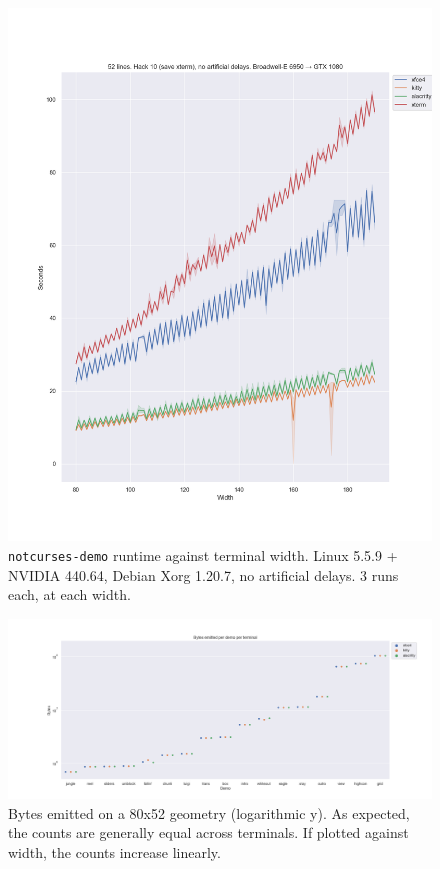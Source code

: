 \begin{figure}[!htb]
\centering
\includegraphics[width=1\textwidth]{media/nvidia-termsdemo.png}
\caption[NVIDIA GTX 1080 benchmarks, varying widths.]{\texttt{notcurses-demo} runtime against terminal width. Linux 5.5.9 + NVIDIA 440.64, Debian Xorg 1.20.7, no artificial delays. 3 runs each, at each width.}
\label{fig:nvidia-full}
\end{figure}

\begin{figure}[!htb]
\centering
\includegraphics[width=1\textwidth]{media/plotbytes.png}
\caption[Bytes output per demo per term.]{Bytes emitted on a 80x52 geometry (logarithmic y). As expected, the counts are generally equal across terminals. If plotted against width, the counts increase linearly.}
\label{fig:nvidia-bytes}
\end{figure}

